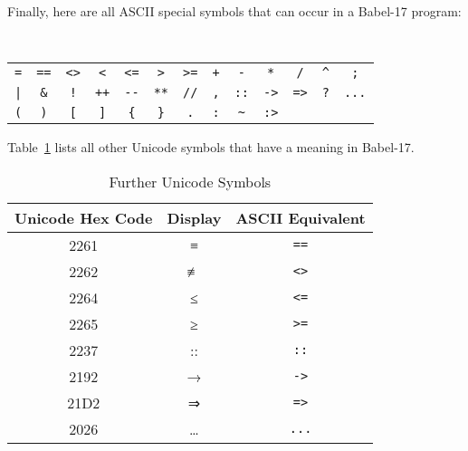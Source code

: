 \documentclass[11pt]{amsart}
\begin{document}
Finally, here are all ASCII special symbols that can occur in a Babel-17 program:
\newcommand{\mapcurlyleft}{\{|}
\begin{center}
\tt
\begin{tabular}{ccccccccccccc}
\verb+=+ & \verb+==+ & \verb+<>+ & \verb+<+ & \verb+<=+ & \verb+>+& \verb+>=+  &
\verb-+- & \verb+-+ & \verb+*+ & \verb+/+ & \verb+^+ & \verb+;+  \\
\verb-|- & \verb+&+ & \verb+!+ & \verb-++- & \verb+--+& \verb+**+  &
\verb-//- & \verb+,+ & \verb+::+ & \verb+->+ & \verb+=>+& \verb+?+  & \verb+...+  \\
\verb-(- & \verb+)+ & \verb+[+ & \verb+]+ & \verb+{+& \verb+}+  & \verb+.+ &  \verb+:+ &
 \verb+~+ &\verb+:>+ & &
\end{tabular}
\end{center}
Table~\ref{table:furthersymbols} lists all other Unicode symbols that have a meaning in Babel-17.
\begin{table}
\caption{Further Unicode Symbols}
\begin{tabular}{c|c|c}
\textbf{Unicode Hex Code} & \textbf{Display} & \textbf{ASCII Equivalent}\\\hline
2261 & ≡ & \verb+==+\\
2262 & ≢ & \verb+<>+\\
2264 & ≤ & \verb+<=+\\
2265 &  ≥ & \verb+>=+\\
2237 & :: & \verb+::+\\
2192 & → & \verb+->+\\
21D2 & ⇒ & \verb+=>+\\
2026 & … & \verb+...+\\
\end{tabular}
\label{table:furthersymbols}
\end{table}
\end{document}
